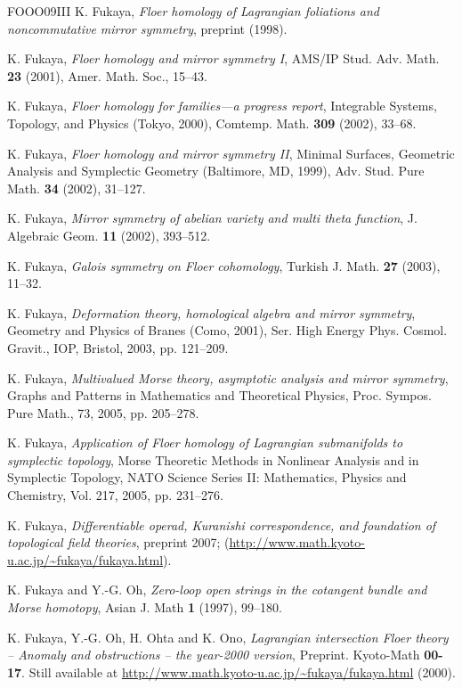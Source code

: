\begin{thebibliography}{FOOO09III}
 K. Fukaya, \emph{Floer homology of Lagrangian foliations and noncommutative mirror symmetry}, preprint (1998).

 K. Fukaya, \emph{Floer homology and mirror symmetry I}, AMS/IP Stud. Adv. Math. \textbf{23} (2001), Amer. Math. Soc., 15–43.

 K. Fukaya, \emph{Floer homology for families—a progress report}, Integrable Systems, Topology, and Physics (Tokyo, 2000), Comtemp. Math. \textbf{309} (2002), 33–68.

 K. Fukaya, \emph{Floer homology and mirror symmetry II}, Minimal Surfaces, Geometric Analysis and Symplectic Geometry (Baltimore, MD, 1999), Adv. Stud. Pure Math. \textbf{34} (2002), 31–127.

 K. Fukaya, \emph{Mirror symmetry of abelian variety and multi theta function}, J. Algebraic Geom. \textbf{11} (2002), 393–512.

 K. Fukaya, \emph{Galois symmetry on Floer cohomology}, Turkish J. Math. \textbf{27} (2003), 11–32.

 K. Fukaya, \emph{Deformation theory, homological algebra and mirror symmetry}, Geometry and Physics of Branes (Como, 2001), Ser. High Energy Phys. Cosmol. Gravit., IOP, Bristol, 2003, pp. 121–209.

 K. Fukaya, \emph{Multivalued Morse theory, asymptotic analysis and mirror symmetry}, Graphs and Patterns in Mathematics and Theoretical Physics, Proc. Sympos. Pure Math., 73, 2005, pp. 205–278.

 K. Fukaya, \emph{Application of Floer homology of Lagrangian submanifolds to symplectic topology}, Morse Theoretic Methods in Nonlinear Analysis and in Symplectic Topology, NATO Science Series II: Mathematics, Physics and Chemistry, Vol. 217, 2005, pp. 231–276.

 K. Fukaya, \emph{Differentiable operad, Kuranishi correspondence, and foundation of topological field theories}, preprint 2007; (\url{http://www.math.kyoto-u.ac.jp/~fukaya/fukaya.html}).

 K. Fukaya and Y.-G. Oh, \emph{Zero-loop open strings in the cotangent bundle and Morse homotopy}, Asian J. Math \textbf{1} (1997), 99–180.

 K. Fukaya, Y.-G. Oh, H. Ohta and K. Ono, \emph{Lagrangian intersection Floer theory – Anomaly and obstructions – the year-2000 version}, Preprint. Kyoto-Math \textbf{00-17}. Still available at \url{http://www.math.kyoto-u.ac.jp/~fukaya/fukaya.html} (2000).


\end{thebibliography}
